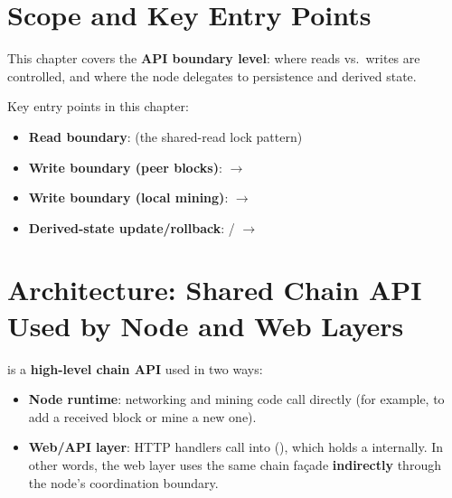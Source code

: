 \section{Scope and Key Entry Points}
\label{sec:ch09-2-scope}

This chapter covers the \textbf{API boundary level}: where reads vs.\ writes are controlled, and where the node delegates to persistence and derived state.

Key entry points in this chapter:

\begin{itemize}
  \item \textbf{Read boundary}:  (the shared-read lock pattern)
  \item \textbf{Write boundary (peer blocks)}:  \(\to\) 
  \item \textbf{Write boundary (local mining)}:  \(\to\) 
  \item \textbf{Derived-state update/rollback}:  /  \(\to\) 
\end{itemize}

\section{Architecture: Shared Chain API Used by Node and Web Layers}
\label{sec:ch09-2-architecture}

 is a \textbf{high-level chain API} used in two ways:

\begin{itemize}
  \item \textbf{Node runtime}: networking and mining code call  directly (for example, to add a received block or mine a new one).
  \item \textbf{Web/API layer}: HTTP handlers call into  (), which holds a  internally. In other words, the web layer uses the same chain façade \textbf{indirectly} through the node's coordination boundary.
\end{itemize}

